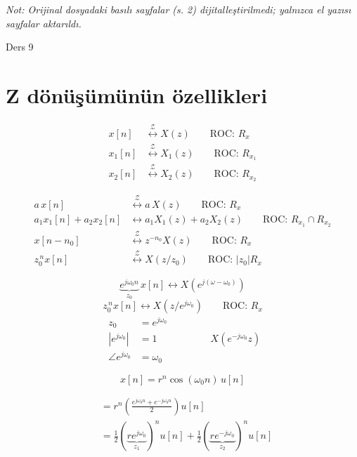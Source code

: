 \documentclass[11pt,a4paper]{article}
\begin{document}
\textit{Not: Orijinal dosyadaki basılı sayfalar (s. 2) dijitalleştirilmedi; yalnızca el yazısı sayfalar aktarıldı.}

Ders 9

\section{Z dönüşümünün özellikleri}

\[ \begin{aligned}
x[n] &\overset{\mathcal{Z}}{\longleftrightarrow} X(z) \qquad \text{ROC: } R_x \\
x_1[n] &\overset{\mathcal{Z}}{\longleftrightarrow} X_1(z) \qquad \text{ROC: } R_{x_1} \\
x_2[n] &\overset{\mathcal{Z}}{\longleftrightarrow} X_2(z) \qquad \text{ROC: } R_{x_2}
\end{aligned} \]

\[ \begin{aligned}
a\,x[n] &\overset{\mathcal{Z}}{\longleftrightarrow} a\,X(z) \qquad \text{ROC: } R_x \\
a_1x_1[n]+a_2x_2[n] &\longleftrightarrow a_1X_1(z)+a_2X_2(z) \qquad \text{ROC: } R_{x_1}\cap R_{x_2} \\
x[n-n_0] &\overset{\mathcal{Z}}{\longleftrightarrow} z^{-n_0}X(z) \qquad \text{ROC: } R_x \\
z_0^{\,n}x[n] &\overset{\mathcal{Z}}{\longleftrightarrow} X(z/z_0) \qquad \text{ROC: } |z_0|R_x
\end{aligned} \]

\begin{ornek}
\[ \underbrace{e^{j\omega_0 n}}_{z_0}\,x[n] \longleftrightarrow X\!\left(e^{j(\omega-\omega_0)}\right) \]
\[ z_0^{\,n}x[n] \longleftrightarrow X\!\left(z/e^{j\omega_0}\right) \qquad \text{ROC: } R_x \]
\[ \begin{aligned} z_0 &= e^{j\omega_0} \\ |e^{j\omega_0}| &= 1 \\ \angle e^{j\omega_0} &= \omega_0 \end{aligned} \qquad\qquad X\!\left(e^{-j\omega_0}z\right) \]
\end{ornek}

\begin{ornek}
\[ x[n] = r^n\cos(\omega_0 n)\,u[n] \]
\end{ornek}

\[ \begin{aligned}
&= r^n\left(\frac{e^{j\omega_0 n}+e^{-j\omega_0 n}}{2}\right)u[n] \\
&= \frac12\left(\underbrace{re^{j\omega_0}}_{z_1}\right)^{n}u[n] + \frac12\left(\underbrace{re^{-j\omega_0}}_{z_2}\right)^{n}u[n]
\end{aligned} \]
\end{document}
